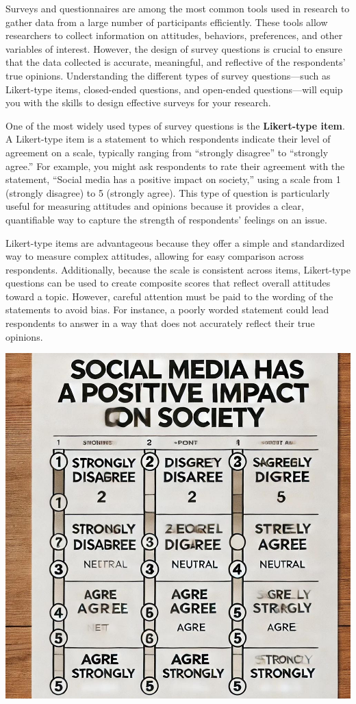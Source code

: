 \documentclass[
]{book}
\begin{document}
Surveys and questionnaires are among the most common tools used in research to gather data from a large number of participants efficiently. These tools allow researchers to collect information on attitudes, behaviors, preferences, and other variables of interest. However, the design of survey questions is crucial to ensure that the data collected is accurate, meaningful, and reflective of the respondents' true opinions. Understanding the different types of survey questions---such as Likert-type items, closed-ended questions, and open-ended questions---will equip you with the skills to design effective surveys for your research.

One of the most widely used types of survey questions is the \textbf{Likert-type item}. A Likert-type item is a statement to which respondents indicate their level of agreement on a scale, typically ranging from ``strongly disagree'' to ``strongly agree.'' For example, you might ask respondents to rate their agreement with the statement, ``Social media has a positive impact on society,'' using a scale from 1 (strongly disagree) to 5 (strongly agree). This type of question is particularly useful for measuring attitudes and opinions because it provides a clear, quantifiable way to capture the strength of respondents' feelings on an issue.

Likert-type items are advantageous because they offer a simple and standardized way to measure complex attitudes, allowing for easy comparison across respondents. Additionally, because the scale is consistent across items, Likert-type questions can be used to create composite scores that reflect overall attitudes toward a topic. However, careful attention must be paid to the wording of the statements to avoid bias. For instance, a poorly worded statement could lead respondents to answer in a way that does not accurately reflect their true opinions.

\includegraphics[width=1\linewidth,height=\textheight,keepaspectratio]{images/fig037.jpg}
\end{document}
